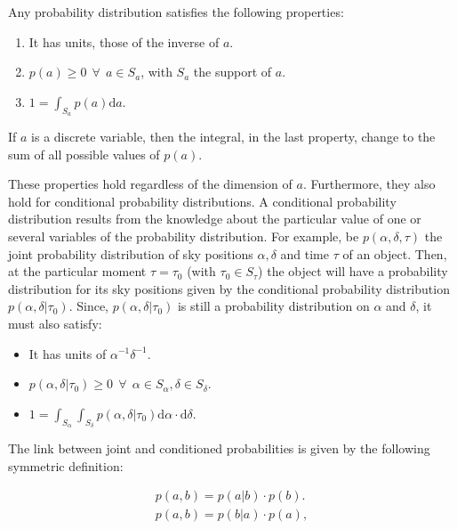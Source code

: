 Any probability distribution satisfies the following properties:

\begin{enumerate}[label=\textbf{Property \arabic*}]
\item  It has units, those of the inverse of $a$. \label{property:1}
\item $p(a) \geq 0 \ \ \forall \ \ a\in S_a$, with $S_a$ the support of $a$. \label{property:3}
\item $1=\int_{S_a} p(a) \mathrm{d}a$. \label{property:3}
\end{enumerate}

If $a$ is a discrete variable, then the integral, in the last property, change to the sum of all possible values of $p(a)$.

These properties hold regardless of the dimension of $a$. Furthermore, they also hold for conditional probability distributions. A conditional probability distribution results from the knowledge about the particular value of one or several variables of the probability distribution. For example, be $p(\alpha,\delta,\tau)$ the joint probability distribution of sky positions $\alpha,\delta$ and time $\tau$ of an object. Then, at the particular moment $\tau=\tau_0$ (with $\tau_0 \in S_{\tau}$) the object will have a probability distribution for its sky positions given by the conditional probability distribution $p(\alpha,\delta|\tau_0)$. Since, $p(\alpha,\delta|\tau_0)$ is still a probability distribution on $\alpha$ and $\delta$, it must also satisfy:

\begin{itemize}
\item It has units of $\alpha^{-1} \delta^{-1}$.
\item $p(\alpha,\delta|\tau_0)\geq0 \ \ \forall \ \ \alpha\in S_{\alpha}, \delta\in S_{\delta}$. %
\item $1=\int_{S_{\alpha}} \int_{S_{\delta}} p(\alpha,\delta|\tau_0)\mathrm{d}\alpha\cdot \mathrm{d}\delta$.
\end{itemize}

The link between joint and conditioned probabilities is given by the following symmetric definition:

\begin{align}
p(a,b)=p(a|b)\cdot p(b).\nonumber \\
p(a,b)=p(b|a) \cdot p(a),
\end{align}

